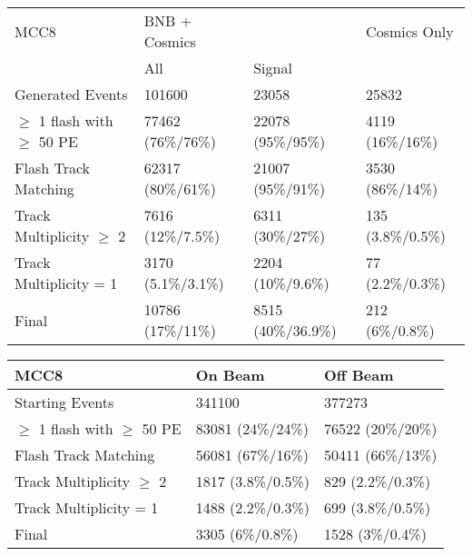 \documentclass[12pt]{article}
\begin{document}
\begin{table*} %
\centering
{}
 \begin{tabular}{| l | l l | l |}
 \hline
 MCC8 & BNB + Cosmics & & Cosmics Only \\ [0.1ex] 
   & All & Signal &  \\ [0.1ex] \hline
 Generated Events & 101600 & 23058 & 25832 \\ %
 $\geq$ 1 flash with $\geq$ 50 PE & 77462 (76\%/76\%) & 22078 (95\%/95\%) & 4119 (16\%/16\%)   \\ %
 Flash Track Matching & 62317 (80\%/61\%) & 21007 (95\%/91\%) & 3530 (86\%/14\%)  \\ \hline
Track Multiplicity $\geq$ 2 & 7616 (12\%/7.5\%) & 6311 (30\%/27\%) & 135 (3.8\%/0.5\%) \\ %
Track Multiplicity = 1 & 3170 (5.1\%/3.1\%) & 2204 (10\%/9.6\%) & 77 (2.2\%/0.3\%)   \\ %
Final  & 10786 (17\%/11\%) & 8515 (40\%/36.9\%) & 212 (6\%/0.8\%)   \\ \hline
\end{tabular}
\end{table*}

\begin{table*} %
\centering
{}
 \begin{tabular}{| l | l | l |}
 \hline
 MCC8 & On Beam & Off Beam \\ [0.1ex] \hline
 Starting Events & 341100 & 377273 \\ %
 $\geq$ 1 flash with $\geq$ 50 PE & 83081 (24\%/24\%) & 76522 (20\%/20\%)  \\ %
 Flash Track Matching & 56081 (67\%/16\%) & 50411 (66\%/13\%)  \\ \hline
Track Multiplicity $\geq$ 2 & 1817 (3.8\%/0.5\%) & 829 (2.2\%/0.3\%) \\ %
Track Multiplicity = 1 & 1488 (2.2\%/0.3\%) & 699 (3.8\%/0.5\%)   \\ %
Final & 3305 (6\%/0.8\%) & 1528 (3\%/0.4\%)  \\ \hline
\end{tabular}
\end{table*}
\end{document}
